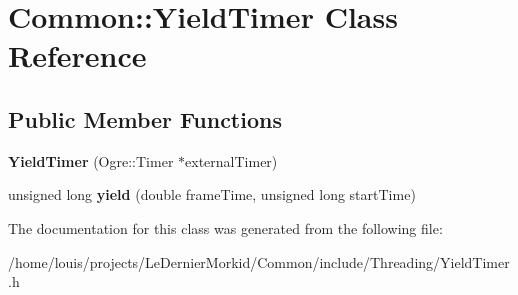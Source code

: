\hypertarget{class_common_1_1_yield_timer}{}\section{Common\+:\+:Yield\+Timer Class Reference}
\label{class_common_1_1_yield_timer}
\subsection*{Public Member Functions}
\begin{DoxyCompactItemize}
\item 
\mbox{\label{class_common_1_1_yield_timer_a4d1c12e6e3f5e825d796286f0c1e2345}} 
{\bfseries Yield\+Timer} (Ogre\+::\+Timer $\ast$external\+Timer)
\item 
\mbox{\label{class_common_1_1_yield_timer_a55ba2e4b796cc59768c5200cc38d303c}} 
unsigned long {\bfseries yield} (double frame\+Time, unsigned long start\+Time)
\end{DoxyCompactItemize}


The documentation for this class was generated from the following file\+:\begin{DoxyCompactItemize}
\item 
/home/louis/projects/\+Le\+Dernier\+Morkid/\+Common/include/\+Threading/Yield\+Timer.\+h\end{DoxyCompactItemize}
